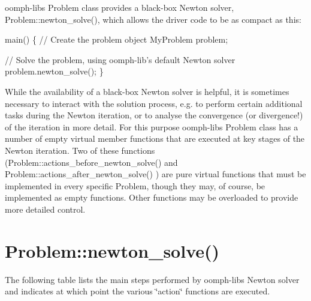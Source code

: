 {\ttfamily oomph-\/lib\textquotesingle{}s} {\ttfamily Problem} class provides a black-\/box Newton solver, {\ttfamily Problem\+::newton\+\_\+solve()}, which allows the driver code to be as compact as this\+: 
\begin{DoxyCode}
main()
\{
  \textcolor{comment}{// Create the problem object}
  MyProblem problem;
  
  \textcolor{comment}{// Solve the problem, using oomph-lib's default Newton solver}
  problem.newton\_solve();
\}
\end{DoxyCode}


While the availability of a black-\/box Newton solver is helpful, it is sometimes necessary to interact with the solution process, e.\+g. to perform certain additional tasks during the Newton iteration, or to analyse the convergence (or divergence!) of the iteration in more detail. For this purpose {\ttfamily oomph-\/lib\textquotesingle{}s} {\ttfamily Problem} class has a number of empty virtual member functions that are executed at key stages of the Newton iteration. Two of these functions ({\ttfamily Problem\+::actions\+\_\+before\+\_\+newton\+\_\+solve()} and {\ttfamily Problem\+::actions\+\_\+after\+\_\+newton\+\_\+solve()} ) are pure virtual functions that must be implemented in every specific Problem, though they may, of course, be implemented as empty functions. Other functions may be overloaded to provide more detailed control.



 

\hypertarget{index_newton_solve}{}\section{Problem\+::newton\+\_\+solve()}\label{index_newton_solve}
The following table lists the main steps performed by {\ttfamily oomph-\/lib\textquotesingle{}s} Newton solver and indicates at which point the various \char`\"{}action\char`\"{} functions are executed.

